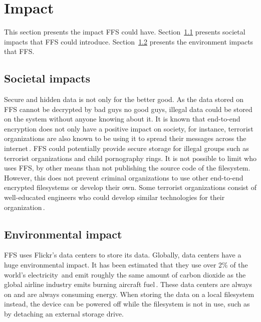 \section{Impact}
This section presents the impact \gls{FFS} could have. Section~\ref{subsec:imp_soc} presents societal impacts that \gls{FFS} could introduce. Section~\ref{subsec:imp_env} presents the environment impacts that \gls{FFS}.

\subsection{Societal impacts}
\label{subsec:imp_soc}
Secure and hidden data is not only for the better good. As the data stored on \gls{FFS} cannot be decrypted by bad guys no good guys, illegal data could be stored on the system without anyone knowing about it. It is known that end-to-end encryption does not only have a positive impact on society, for instance, terrorist organizations are also known to be using it to spread their messages across the internet\,\cite{ruddEncryptionCounterterrorismGetting2017}. \gls{FFS} could potentially provide secure storage for illegal groups such as terrorist organizations and child pornography rings. It is not possible to limit who uses \gls{FFS}, by other means than not publishing the source code of the filesystem. However, this does not prevent criminal organizations to use other end-to-end encrypted filesystems or develop their own. Some terrorist organizations consist of well-educated engineers who could develop similar technologies for their organization\,\cite{berrebyEngineeringTerror2010}.

\subsection{Environmental impact}
\label{subsec:imp_env}
FFS uses Flickr's data centers to store its data. Globally, data centers have a huge environmental impact. It has been estimated that they use over 2\% of the world's electricity\,\cite{mcleanDataCentersGenerate2020} and emit roughly the same amount of carbon dioxide as the global airline industry emits burning aircraft fuel\,\cite{pearceEnergyHogsCan}. These data centers are always on and are always consuming energy. When storing the data on a local filesystem instead, the device can be powered off while the filesystem is not in use, such as by detaching an external storage drive.

